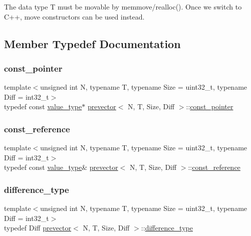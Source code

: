 The data type T must be movable by memmove/realloc(). Once we switch to C++, move constructors can be used instead. 

\subsection{Member Typedef Documentation}
\mbox{\label{classprevector_ae322a41a56ba4c7aad96a2270b9f34fc}} 
\subsubsection{\texorpdfstring{const\+\_\+pointer}{const\_pointer}}
{\footnotesize\ttfamily template$<$unsigned int N, typename T, typename Size = uint32\+\_\+t, typename Diff = int32\+\_\+t$>$ \\
typedef const \mbox{\hyperlink{classprevector_aaab8519e15c3bdebdcc4bbc86fcff33c}{value\+\_\+type}}$\ast$ \mbox{\hyperlink{classprevector}{prevector}}$<$ N, T, Size, Diff $>$\+::\mbox{\hyperlink{classprevector_ae322a41a56ba4c7aad96a2270b9f34fc}{const\+\_\+pointer}}}

\mbox{\label{classprevector_a381a4d3f4c3f74fde0c92ef21e755ef4}} 
\subsubsection{\texorpdfstring{const\+\_\+reference}{const\_reference}}
{\footnotesize\ttfamily template$<$unsigned int N, typename T, typename Size = uint32\+\_\+t, typename Diff = int32\+\_\+t$>$ \\
typedef const \mbox{\hyperlink{classprevector_aaab8519e15c3bdebdcc4bbc86fcff33c}{value\+\_\+type}}\& \mbox{\hyperlink{classprevector}{prevector}}$<$ N, T, Size, Diff $>$\+::\mbox{\hyperlink{classprevector_a381a4d3f4c3f74fde0c92ef21e755ef4}{const\+\_\+reference}}}

\mbox{\label{classprevector_a34ad7f610eefb33a8db9161cadf15dbe}} 
\subsubsection{\texorpdfstring{difference\+\_\+type}{difference\_type}}
{\footnotesize\ttfamily template$<$unsigned int N, typename T, typename Size = uint32\+\_\+t, typename Diff = int32\+\_\+t$>$ \\
typedef Diff \mbox{\hyperlink{classprevector}{prevector}}$<$ N, T, Size, Diff $>$\+::\mbox{\hyperlink{classprevector_a34ad7f610eefb33a8db9161cadf15dbe}{difference\+\_\+type}}}

